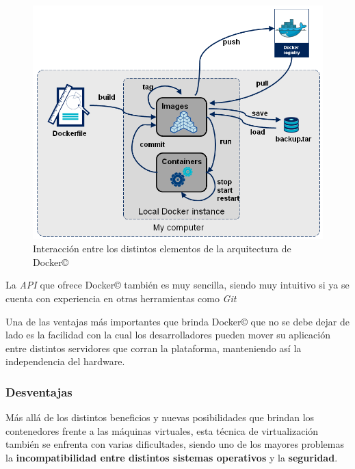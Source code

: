 \documentclass[14pt]{extarticle}
\newcommand{\docker}{Docker\copyright}
\begin{document}
        \begin{figure}[h]
            \centering
            \includegraphics[scale=0.65]{docker-stages.png}
            \caption{Interacción entre los distintos elementos de la arquitectura de \docker{}\cite{stages}}
        \end{figure}

        La \textit{API} que ofrece \docker{} también es muy sencilla, siendo muy intuitivo si ya se cuenta con experiencia en otras herramientas como \textit{Git}

        Una de las ventajas más importantes que brinda \docker{} que no se debe dejar de lado es la facilidad con la cual los desarrolladores pueden mover su aplicación entre distintos servidores que corran la plataforma, manteniendo así la independencia del hardware.

        
        \subsubsection*{Desventajas}
        Más allá de los distintos beneficios y nuevas posibilidades que brindan los contenedores frente a las máquinas virtuales, esta técnica de virtualización también se enfrenta con varias dificultades, siendo uno de los mayores problemas la \textbf{incompatibilidad entre distintos sistemas operativos} y la \textbf{seguridad}.
\end{document}
